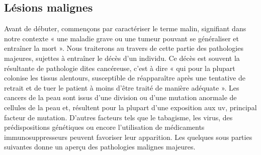 \subsection{Lésions malignes}
Avant de débuter, commençons par caractériser le terme malin, signifiant dans notre contexte « une maladie grave ou une tumeur pouvant se généraliser et entraîner la mort ». Nous traiterons au travers de cette partie des pathologies majeures, sujettes à entraîner le décès d’un individu. Ce décès est souvent la résultante de pathologie dites cancéreuse, c'est à dire « qui pour la plupart colonise les tissus alentours, susceptible de réapparaître après une tentative de retrait et de tuer le patient à moins d’être traité de manière adéquate ». Les cancers de la peau sont issus d’une division ou d’une mutation anormale de cellules de la peau et, résultent pour la plupart d’une exposition aux \gls{uv}, principal facteur de mutation. D’autres facteurs tels que le tabagisme, les virus, des prédispositions génétiques ou encore l’utilisation de médicaments immunosuppresseurs peuvent favoriser leur apparition. Les quelques sous parties suivantes donne un aperçu des pathologies malignes majeures.\par

